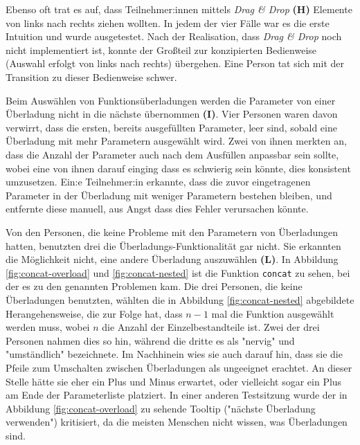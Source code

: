 Ebenso oft trat es auf, dass Teilnehmer:innen mittels \textit{Drag \& Drop} \textbf{(H)} Elemente von links nach rechts ziehen wollten. In jedem der vier Fälle war es die erste Intuition und wurde ausgetestet. Nach der Realisation, dass \textit{Drag \& Drop} noch nicht implementiert ist, konnte der Großteil zur konzipierten Bedienweise (Auswahl erfolgt von links nach rechts) übergehen. Eine Person tat sich mit der Transition zu dieser Bedienweise schwer.

Beim Auswählen von Funktionsüberladungen werden die Parameter von einer Überladung nicht in die nächste übernommen \textbf{(I)}. Vier Personen waren davon verwirrt, dass die ersten, bereits ausgefüllten Parameter, leer sind, sobald eine Überladung mit mehr Parametern ausgewählt wird. Zwei von ihnen merkten an, dass die Anzahl der Parameter auch nach dem Ausfüllen anpassbar sein sollte, wobei eine von ihnen darauf einging dass es schwierig sein könnte, dies konsistent umzusetzen. Ein:e Teilnehmer:in erkannte, dass die zuvor eingetragenen Parameter in der Überladung mit weniger Parametern bestehen bleiben, und entfernte diese manuell, aus Angst dass dies Fehler verursachen könnte.

Von den Personen, die keine Probleme mit den Parametern von Überladungen hatten, benutzten drei die Überladungs-Funktionalität gar nicht. Sie erkannten die Möglichkeit nicht, eine andere Überladung auszuwählen \textbf{(L)}. In Abbildung \ref{fig:concat-overload} und \ref{fig:concat-nested} ist die Funktion \texttt{concat} zu sehen, bei der es zu den genannten Problemen kam. Die drei Personen, die keine Überladungen benutzten, wählten die in Abbildung \ref{fig:concat-nested} abgebildete Herangehensweise, die zur Folge hat, dass $n-1$ mal die Funktion ausgewählt werden muss, wobei $n$ die Anzahl der Einzelbestandteile ist. Zwei der drei Personen nahmen dies so hin, während die dritte es als "nervig" und "umständlich" bezeichnete. Im Nachhinein wies sie auch darauf hin, dass sie die Pfeile zum Umschalten zwischen Überladungen als ungeeignet erachtet. An dieser Stelle hätte sie eher ein Plus und Minus erwartet, oder vielleicht sogar ein Plus am Ende der Parameterliste platziert. In einer anderen Testsitzung wurde der in Abbildung \ref{fig:concat-overload} zu sehende Tooltip ("nächste Überladung verwenden") kritisiert, da die meisten Menschen nicht wissen, was Überladungen sind.

